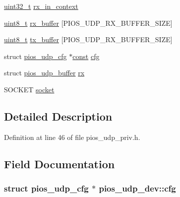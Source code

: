 \begin{DoxyCompactItemize}
\item 
\hyperlink{stdint_8h_a435d1572bf3f880d55459d9805097f62}{uint32\-\_\-t} \hyperlink{structpios__udp__dev_ab49ecb80839ac809a20ae3db49d63919}{rx\-\_\-in\-\_\-context}
\item 
\hyperlink{stdint_8h_aba7bc1797add20fe3efdf37ced1182c5}{uint8\-\_\-t} \hyperlink{structpios__udp__dev_a65502570ba375c9621f1659b8d792a04}{rx\-\_\-buffer} \mbox{[}P\-I\-O\-S\-\_\-\-U\-D\-P\-\_\-\-R\-X\-\_\-\-B\-U\-F\-F\-E\-R\-\_\-\-S\-I\-Z\-E\mbox{]}
\item 
\hyperlink{stdint_8h_aba7bc1797add20fe3efdf37ced1182c5}{uint8\-\_\-t} \hyperlink{structpios__udp__dev_ad712d626bc4160554ceb0765723d6069}{tx\-\_\-buffer} \mbox{[}P\-I\-O\-S\-\_\-\-U\-D\-P\-\_\-\-R\-X\-\_\-\-B\-U\-F\-F\-E\-R\-\_\-\-S\-I\-Z\-E\mbox{]}
\item 
struct \hyperlink{structpios__udp__cfg}{pios\-\_\-udp\-\_\-cfg} $\ast$\hyperlink{group___n_a_m_e_ga7ae6d0e43244213b34de2c2b9aa30da6}{const} \hyperlink{structpios__udp__dev_a896fde0b8234344b1e137dba0034cd65}{cfg}
\item 
struct \hyperlink{structpios__udp__buffer}{pios\-\_\-udp\-\_\-buffer} \hyperlink{structpios__udp__dev_a4e728b107c67f2b1d2e5e1276187446f}{rx}
\item 
S\-O\-C\-K\-E\-T \hyperlink{structpios__udp__dev_a68ba5864c4b71945feb362da0d3e02a1}{socket}
\end{DoxyCompactItemize}


\subsection{Detailed Description}


Definition at line 46 of file pios\-\_\-udp\-\_\-priv.\-h.



\subsection{Field Documentation}
\hypertarget{structpios__udp__dev_a94cd33f1f894b923e930feb577f0a882}{
\subsubsection[{cfg}]{\setlength{\rightskip}{0pt plus 5cm}struct {\bf pios\-\_\-udp\-\_\-cfg} $\ast$ pios\-\_\-udp\-\_\-dev\-::cfg}}\label{structpios__udp__dev_a94cd33f1f894b923e930feb577f0a882}


